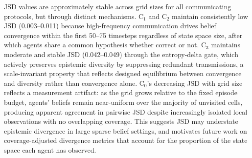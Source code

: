 \documentclass[pdflatex,sn-mathphys-num]{sn-jnl}%
\theoremstyle{thmstyleone}%
\theoremstyle{thmstyletwo}%
\theoremstyle{thmstylethree}%
\begin{document}
JSD values are approximately stable across grid sizes for all 
communicating protocols, but through distinct mechanisms. C$_1$ and 
C$_2$ maintain consistently low JSD (0.003--0.011) because 
high-frequency communication drives belief convergence within the 
first 50--75 timesteps regardless of state space size, after which 
agents share a common hypothesis whether correct or not. C$_3$ 
maintains moderate and stable JSD (0.042--0.049) through the 
entropy-delta gate, which actively preserves epistemic diversity by 
suppressing redundant transmissions, a scale-invariant property 
that reflects designed equilibrium between convergence and diversity 
rather than convergence alone. C$_0$'s decreasing JSD with grid size 
reflects a measurement artifact: as the grid grows relative to the 
fixed episode budget, agents' beliefs remain near-uniform over the 
majority of unvisited cells, producing apparent agreement in pairwise 
JSD despite increasingly isolated local observations with no 
overlapping coverage. This suggests JSD may understate epistemic 
divergence in large sparse belief settings, and motivates future work 
on coverage-adjusted divergence metrics that account for the 
proportion of the state space each agent has observed.
\end{document}
